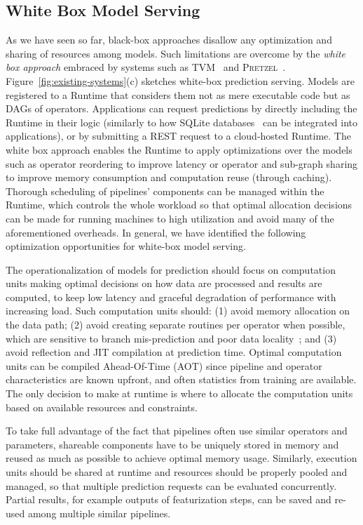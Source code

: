 \documentclass[11pt]{article}
\newcommand{\pretzel}{\textsc{Pretzel}\xspace}
\newcommand{\stitle}[1]{\noindent{\bf #1}}
\begin{document}
\subsection{White Box Model Serving}
\label{sec:white-box}
As we have seen so far, black-box approaches disallow any optimization and sharing of resources among models. 
Such limitations are overcome by the \emph{white box approach} embraced by systems such as TVM~\cite{tvm} and \pretzel~\cite{pretzel-osdi}. 
Figure~\ref{fig:existing-systems}(c) sketches white-box prediction serving. Models are registered to a Runtime that considers them not as mere executable code but as DAGs of operators. 
Applications can request predictions by directly including the Runtime in their logic (similarly to how SQLite databases~\cite{sqlite} can be integrated into applications), or by submitting a REST request to a cloud-hosted Runtime.
The white box approach enables the Runtime to apply optimizations over the models such as operator reordering to improve latency or operator and sub-graph sharing to improve memory consumption and computation reuse (through caching).
Thorough scheduling of pipelines' components can be managed within the Runtime, which controls the whole workload so that optimal allocation decisions can be made for running machines to high utilization and avoid many of the aforementioned overheads.
In general, we have identified the following optimization opportunities for white-box model serving.

\stitle{End-to-end Optimizations:} The operationalization of models for prediction should focus on computation units making optimal decisions on how data are processed and results are computed, to keep low latency and graceful degradation of performance with increasing load. Such computation units should: (1) avoid memory allocation on the data path; (2) avoid creating separate routines per operator when possible, which are sensitive to branch mis-prediction and poor data locality~\cite{Neumann:2011:ECE:2002938.2002940}; and (3) avoid reflection and JIT compilation at prediction time. Optimal computation units can be compiled Ahead-Of-Time (AOT) since pipeline and operator characteristics are known upfront, and often statistics from training are available. The only decision to make at runtime is where to allocate the computation units based on available resources and constraints.

\stitle{Multi-model Optimizations:} To take full advantage of the fact that pipelines often use similar operators and parameters, shareable components have to be uniquely stored in memory and reused as much as possible to achieve optimal memory usage. Similarly, execution units should be shared at runtime and resources should be properly pooled and managed, so that multiple prediction requests can be evaluated concurrently. 
Partial results, for example outputs of featurization steps, can be saved and re-used among multiple similar pipelines.
\end{document}
